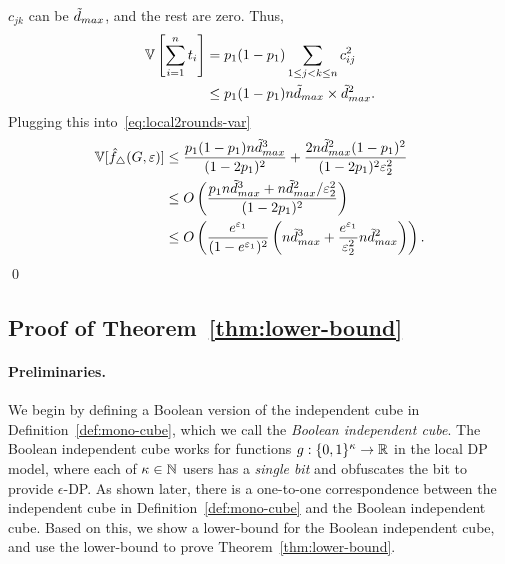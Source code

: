 {  %
  $c_{jk}$ 
  can be $\tilde{d}_{max}$, and the rest are zero. Thus,
  \begin{align*}
    \mathbb{V}\left[\sum_{i=1}^n t_i \right] &=
    p_1(1-p_1) \sum_{1 \leq j < k \leq n} c_{ij}^2 \\ 
    &\leq p_1(1-p_1) n\tilde{d}_{max} \times \tilde{d}_{max}^2.
  \end{align*}
  Plugging this into~\eqref{eq:local2rounds-var}
  \begin{align*}
    \mathbb{V}[\hat{f}_\triangle(G,\varepsilon)] &\leq \frac{p_1(1-p_1)n\tilde{d}_{max}^3}{(1-2p_1)^2} +
    \frac{2n\tilde{d}_{max}^2(1-p_1)^2}{(1-2p_1)^2\varepsilon_2^2} \\
    &\leq O\left(\frac{p_1 n\tilde{d}_{max}^3 + n\tilde{d}_{max}^2/\varepsilon_2^2}{(1-2p_1)^2} \right) \\
    &\leq O\left(\frac{e^{\varepsilon_1}}{(1-e^{\varepsilon_1})^2} \left(n\tilde{d}_{max}^3 +
    \frac{e^{\varepsilon_1}}{\varepsilon_2^2}n\tilde{d}_{max}^2\right)\right).
  \end{align*}
  \qed

\subsection{Proof of Theorem~\ref{thm:lower-bound}}
\label{sub:proof_thm_lower-bound}

\paragraph{Preliminaries.}
We begin by defining a Boolean version of the independent cube in Definition~\ref{def:mono-cube}, which we call the \textit{Boolean independent cube}. 
The Boolean independent cube 
works for functions $g : \{0,1\}^\kappa \rightarrow \mathbb{R}$ in the local DP model, where each of $\kappa \in \mathbb{N}$ users has a \textit{single bit} and obfuscates the bit to provide $\epsilon$-DP. 
As shown later, there is a one-to-one correspondence between the independent cube in Definition~\ref{def:mono-cube} and the Boolean independent cube. 
Based on this, we show a lower-bound for the Boolean independent cube, and use the lower-bound to prove Theorem~\ref{thm:lower-bound}.

}
